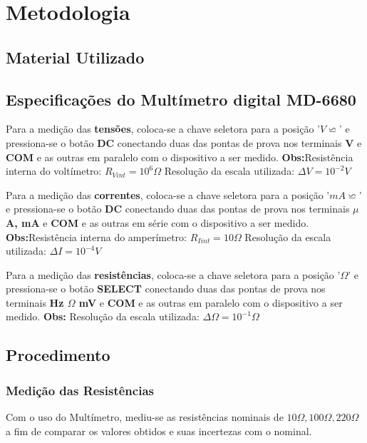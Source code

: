 \section{Metodologia}
    \subsection{Material Utilizado}
        
    \subsection{Especificações do Multímetro digital MD-6680}
        \tab Para a medição das \textbf{tensões}, coloca-se a chave seletora para a posição '$V\backsimeq$' e pressiona-se o botão
        \textbf{DC} conectando duas das pontas de prova nos terminais \textbf{V} e \textbf{COM} e as outras em paralelo com o
        dispositivo a ser medido. \newline
        \textbf{Obs:}Resistência interna do voltímetro: $R_{Vint} = 10^6\Omega$\newline
        \tab Resolução da escala utilizada: $ \Delta V =10^{-2} V$\newline

        Para a medição das \textbf{correntes}, coloca-se a chave seletora para a posição '$mA\backsimeq$' e pressiona-se o botão
        \textbf{DC} conectando duas das pontas de prova nos terminais \textbf{ $\mu$A, mA} e \textbf{COM} e as outras em série com o
        dispositivo a ser medido. \newline
        \textbf{Obs:}Resistência interna do amperímetro: $R_{Iint} = 10\Omega$\newline
        \tab Resolução da escala utilizada: $ \Delta I =10^{-4} V$\newline

        Para a medição das \textbf{resistências}, coloca-se a chave seletora para a posição '$\Omega$' e pressiona-se o botão
        \textbf{SELECT} conectando duas das pontas de prova nos terminais \textbf{ Hz $\Omega$ mV} e \textbf{COM} e as outras em
        paralelo com o dispositivo a ser medido. \newline
        \textbf{Obs:} Resolução da escala utilizada: $ \Delta\Omega =10^{-1} \Omega$

    \subsection{Procedimento}
        \subsubsection{Medição das Resistências}
            Com o uso do Multímetro, mediu-se as resistências nominais de $10\Omega, 100\Omega, 220\Omega$ a fim de comparar os valores obtidos
            e suas incertezas com o nominal.
